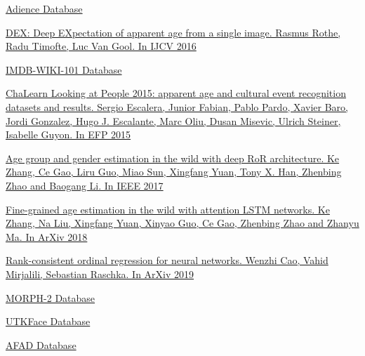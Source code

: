 \begin{thebibliography}{0}
    \hypertarget{adience}{}
    \href{https://talhassner.github.io/home/projects/Adience/Adience-data.html}
    {
        Adience Database
    }

    \hypertarget{imdb}{}
    \href{https://data.vision.ee.ethz.ch/cvl/publications/papers/proceedings/eth_biwi_01229.pdf}
    {
        DEX: Deep EXpectation of apparent age from a single image.
        Rasmus Rothe, Radu Timofte, Luc Van Gool.
        In IJCV 2016
    }

    \hypertarget{imdb_db}{}
    \href{https://data.vision.ee.ethz.ch/cvl/rrothe/imdb-wiki/}
    {
        IMDB-WIKI-101 Database
    }

    \hypertarget{lap}{}
    \href{http://refbase.cvc.uab.es/files/EFP2015.pdf}
    {
        ChaLearn Looking at People 2015: apparent age and cultural event recognition datasets and results.
        Sergio Escalera, Junior Fabian, Pablo Pardo, Xavier Baro, Jordi Gonzalez, Hugo J. Escalante, Marc Oliu, Dusan Misevic, Ulrich Steiner, Isabelle Guyon.
        In EFP 2015
    }

    \hypertarget{ror}{}
    \href{https://arxiv.org/pdf/1710.02985.pdf}
    {
        Age group and gender estimation in the wild with deep RoR architecture.
        Ke Zhang, Ce Gao, Liru Guo, Miao Sun, Xingfang Yuan, Tony X. Han, Zhenbing Zhao and Baogang Li.
        In IEEE 2017
    }

    \hypertarget{lstm}{}
    \href{https://arxiv.org/pdf/1805.10445.pdf}
    {
        Fine-grained age estimation in the wild with attention LSTM networks.
        Ke Zhang, Na Liu, Xingfang Yuan, Xinyao Guo, Ce Gao, Zhenbing Zhao and Zhanyu Ma.
        In ArXiv 2018
    }

    \hypertarget{order}{}
    \href{https://arxiv.org/pdf/1901.07884.pdf}
    {
        Rank-consistent ordinal regression for neural networks.
        Wenzhi Cao, Vahid Mirjalili, Sebastian Raschka.
        In ArXiv 2019
    }

    \hypertarget{morph}{}
    \href{https://ebill.uncw.edu/C20231_ustores/web/classic/store_main.jsp?STOREID=4}
    {
        MORPH-2 Database
    }

    \hypertarget{utk}{}
    \href{https://susanqq.github.io/UTKFace/}
    {
        UTKFace Database
    }

    \hypertarget{afad}{}
    \href{https://afad-dataset.github.io/}
    {
        AFAD Database
    }


\end{thebibliography}
